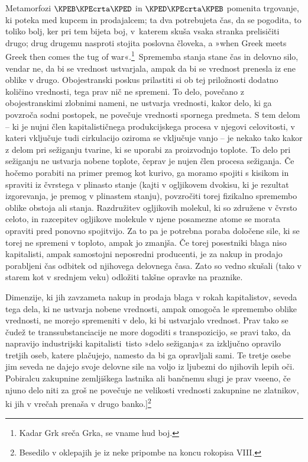 \documentclass[kapital_02.tex]{subfiles}
\begin{document}
\renewcommand*{\thefootnote}{\fnsymbol{footnote}}
Metamorfozi \(\KPEB\KPEcrta\KPED\) in \(\KPED\KPEcrta\KPEB\) pomenita trgovanje, ki poteka med kupcem in prodajalcem; ta dva potrebujeta čas, da se pogodita, to toliko bolj, ker pri tem bijeta boj, v\KPEstran\ katerem skuša vsaka stranka prelisičiti drugo; drug drugemu nasproti stojita poslovna človeka, a »when Greek meets Greek then comes the tug of war«.\footnote{Kadar Grk sreča Grka, se vname hud boj.}\
Sprememba stanja stane čas in delovno silo, vendar ne, da bi se vrednost ustvarjala, ampak da bi se vrednost prenesla iz ene oblike v drugo.
Obojestranski poskus prilastiti si ob tej priložnosti dodatno količino vrednosti, tega prav nič ne spremeni.
To delo, povečano z obojestranskimi zlobnimi nameni, ne ustvarja vrednosti, kakor delo, ki ga povzroča sodni postopek, ne povečuje vrednosti spornega predmeta.
S tem delom -- ki je nujni člen kapitalističnega produkcijskega procesa v njegovi celovitosti, v kateri vključuje tudi cirkulacijo oziroma se vključuje vanjo -- je nekako tako kakor z delom pri sežiganju tvarine, ki se uporabi za proizvodnjo toplote.
To delo pri sežiganju ne ustvarja nobene toplote, čeprav je nujen člen procesa sežiganja. 
Če hočemo porabiti na primer premog kot kurivo, ga moramo spojiti s kisikom in spraviti iz čvrstega v plinasto stanje (kajti v ogljikovem dvokisu, ki je rezultat izgorevanja, je premog v plinastem stanju), povzročiti torej fizikalno spremembo oblike obstoja ali stanja.
Razdružitev ogljikovih molekul, ki so združene v čvrsto celoto, in razcepitev ogljikove molekule v njene posamezne atome se morata opraviti pred ponovno spojitvijo.
Za to pa je potrebna poraba določene sile, ki se torej ne spremeni v toploto, ampak jo zmanjša.
Če torej posestniki blaga niso kapitalisti, ampak samostojni neposredni producenti, je za nakup in prodajo porabljeni čas odbitek od njihovega delovnega časa.
Zato so vedno skušali (tako v starem kot v srednjem veku) odložiti takšne opravke na praznike.
\renewcommand*{\thefootnote}{\arabic{footnote}}
\setcounter{footnote}{9}

Dimenzije, ki jih zavzameta nakup in prodaja blaga v rokah kapitalistov, seveda tega dela, ki ne ustvarja nobene vrednosti, ampak omogoča le spremembo oblike vrednosti, ne morejo spremeniti v delo, ki bi ustvarjalo vrednost.
Prav tako se čudež te transsubstanciacije ne more dogoditi s
transpozicijo, se pravi tako, da napravijo industrijski kapitalisti\KPEstran\ tisto »delo sežiganja« za izključno opravilo tretjih oseb, katere plačujejo, namesto da bi ga opravljali sami. Te tretje osebe jim seveda ne dajejo svoje delovne sile na voljo iz ljubezni do njihovih lepih oči.
Pobiralcu zakupnine zemljiškega lastnika ali bančnemu slugi je prav vseeno, če njuno delo niti za groš ne povečuje ne velikosti vrednosti zakupnine ne zlatnikov, ki jih v vrečah prenaša v drugo banko.]\footnote
{Besedilo v oklepajih je iz neke pripombe na koncu rokopisa VIII.}
\end{document}
